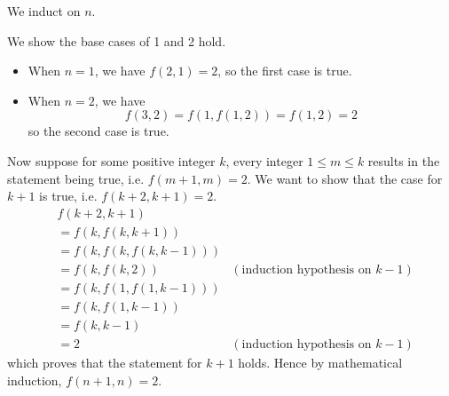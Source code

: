 \begin{questions}
\begin{partquestions}{\roman*}
        \item We induct on $n$.

        We show the base cases of 1 and 2 hold.
        \begin{itemize}
            \item When $n = 1$, we have $f(2, 1) = 2$, so the first case is true.
            \item When $n = 2$, we have
            \[
                f(3,2) = f(1, f(1, 2)) = f(1, 2) = 2
            \]
            so the second case is true.
        \end{itemize}

        Now suppose for some positive integer $k$, every integer $1 \leq m \leq k$ results in the statement being true, i.e. $f(m+1,m) = 2$. We want to show that the case for $k+1$ is true, i.e. $f(k+2, k+1) = 2$.
        \begin{align*}
            &f(k+2, k+1)\\
            &= f(k, f(k, k+1))\\
            &= f(k, f(k, f(k, k-1)))\\
            &= f(k, f(k, 2)) & (\text{induction hypothesis on } k-1)\\
            &= f(k, f(1, f(1, k-1)))\\
            &= f(k, f(1, k-1))\\
            &= f(k, k-1) \\
            &= 2 & (\text{induction hypothesis on } k-1)
        \end{align*}
        which proves that the statement for $k+1$ holds. Hence by mathematical induction, $f(n+1, n) = 2$.


\end{partquestions}
\end{questions}
